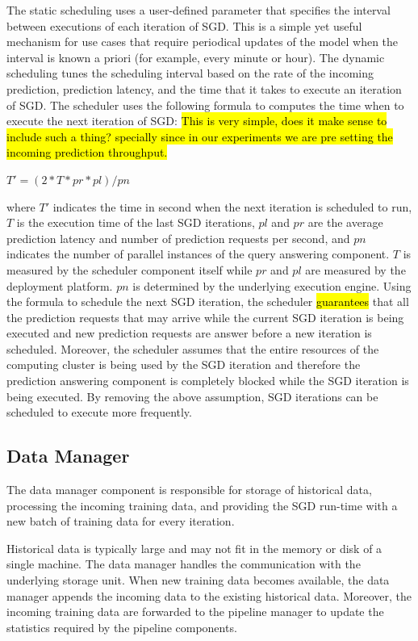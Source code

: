 The static scheduling uses a user-defined parameter that specifies the interval between executions of each iteration of SGD.
This is a simple yet useful mechanism for use cases that require periodical updates of the model when the interval is known a priori (for example, every minute or hour). 
The dynamic scheduling tunes the scheduling interval based on the rate of the incoming prediction, prediction latency, and the time that it takes to execute an iteration of SGD.
The scheduler uses the following formula to computes the time when to execute the next iteration of SGD:
\hl{This is very simple, does it make sense to include such a thing? specially since in our experiments we are pre setting the incoming prediction throughput.}
\begin{center}
$T' = (2 * T * pr * pl) / pn$
\end{center}
where $T'$ indicates the time in second when the next iteration is scheduled to run, $T$ is the execution time of the last SGD iterations, $pl$ and $pr$ are the average prediction latency and number of prediction requests per second, and $pn$ indicates the number of parallel instances of the query answering component.
$T$ is measured by the scheduler component itself while $pr$ and $pl$ are measured by the deployment platform.
$pn$ is determined by the underlying execution engine.
Using the formula to schedule the next SGD iteration, the scheduler \hl{guarantees} that all the prediction requests that may arrive while the current SGD iteration is being executed and new prediction requests are answer before a new iteration is scheduled.
Moreover, the scheduler assumes that the entire resources of the computing cluster is being used by the SGD iteration and therefore the prediction answering component is completely blocked while the SGD iteration is being executed.
By removing the above assumption, SGD iterations can be scheduled to execute more frequently.

\subsection{Data Manager} \label{data-manager}
The data manager component is responsible for storage of historical data, processing the incoming training data, and providing the SGD run-time with a new batch of training data for every iteration.

Historical data is typically large and may not fit in the memory or disk of a single machine. 
The data manager handles the communication with the underlying storage unit.
When new training data becomes available, the data manager appends the incoming data to the existing historical data.
Moreover, the incoming training data are forwarded to the pipeline manager to update the statistics required by the pipeline components.

